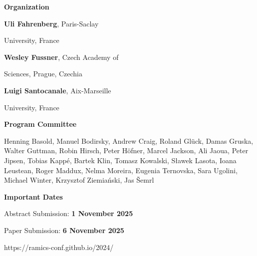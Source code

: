 \documentclass[a3paper, 12pt]{article}
\begin{document}
\begin{minipage}[t]{.43\linewidth}


  

  \vspace*{2ex}
  
  \hfill {\Large \bf Organization}

  \smallskip

  \hfill \textbf{Uli Fahrenberg}, Paris-Saclay

  \hfill University, France

  \hfill \textbf{Wesley Fussner}, Czech Academy of

  \hfill Sciences, Prague, Czechia

  \hfill \textbf{Luigi Santocanale}, Aix-Marseille

  \hfill University, France

  \bigskip

  \hfill {\Large \bf Program Committee}

  \medskip

Henning Basold,
Manuel Bodirsky,
Andrew Craig,
Roland Glück,
Damas Gruska,
Walter Guttman,
Robin Hirsch,
Peter Höfner,
Marcel Jackson,
Ali Jaoua,
Peter Jipsen,
Tobias Kappé,
Bartek Klin,
Tomasz Kowalski,
Sławek Lasota,
Ioana Leustean,
Roger Maddux,
Nelma Moreira,
Eugenia Ternovska,
Sara Ugolini,
Michael Winter,
Krzysztof Ziemiański,
Jas Šemrl
  
  \bigskip
  
  \hfill
  {\Large \bf Important Dates}

  \smallskip

  \hfill Abstract Submission: \textbf{1 November 2025}
  
  \hfill Paper Submission: \textbf{6 November 2025}
  


  \vspace{8ex}

  \hspace*{-15ex} {\fontsize{30}{40}\selectfont https://ramics-conf.github.io/2024/}

  \vspace*{-2ex}

\end{minipage}
\end{document}
